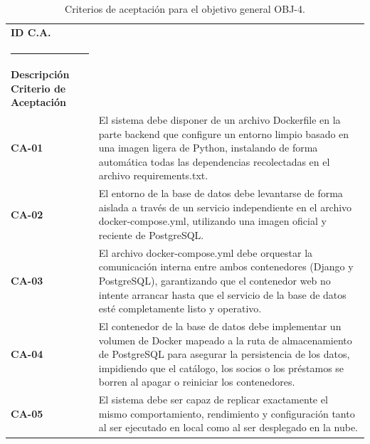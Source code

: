 \begin{table}[H]
	\centering
	\caption{Criterios de aceptación para el objetivo general OBJ-4.}
	\label{tab:criterios_aceptacion_normal04}
	\begin{tabularx}{\textwidth}{l X}
		\toprule
		\textbf{ID C.A.} & 
		\begin{minipage}[t]{\linewidth}
			\textbf{ID Objetivo asociado: OBJ-4 <Garantizar la portabilidad del sistema>} \\[2pt]
			\rule{\linewidth}{0.4pt} \\[2pt]
			\textbf{Descripción Criterio de Aceptación}
		\end{minipage} \\
		\midrule
		\textbf{CA-01} & El sistema debe disponer de un archivo Dockerfile en la parte backend que configure un entorno limpio basado en una imagen ligera de Python, instalando de forma automática todas las dependencias recolectadas en el archivo requirements.txt. \\
		\addlinespace
		\textbf{CA-02} & El entorno de la base de datos debe levantarse de forma aislada a través de un servicio independiente en el archivo docker-compose.yml, utilizando una imagen oficial y reciente de PostgreSQL. \\
		\addlinespace
		\textbf{CA-03} & El archivo docker-compose.yml debe orquestar la comunicación interna entre ambos contenedores (Django y PostgreSQL), garantizando que el contenedor web no intente arrancar hasta que el servicio de la base de datos esté completamente listo y operativo. \\
		\addlinespace
		\textbf{CA-04} & El contenedor de la base de datos debe implementar un volumen de Docker mapeado a la ruta de almacenamiento de PostgreSQL para asegurar la persistencia de los datos, impidiendo que el catálogo, los socios o los préstamos se borren al apagar o reiniciar los contenedores. \\
		\addlinespace
		\textbf{CA-05} & El sistema debe ser capaz de replicar exactamente el mismo comportamiento, rendimiento y configuración tanto al ser ejecutado en local como al ser desplegado en la nube. \\
		\bottomrule
	\end{tabularx}	
\end{table}

